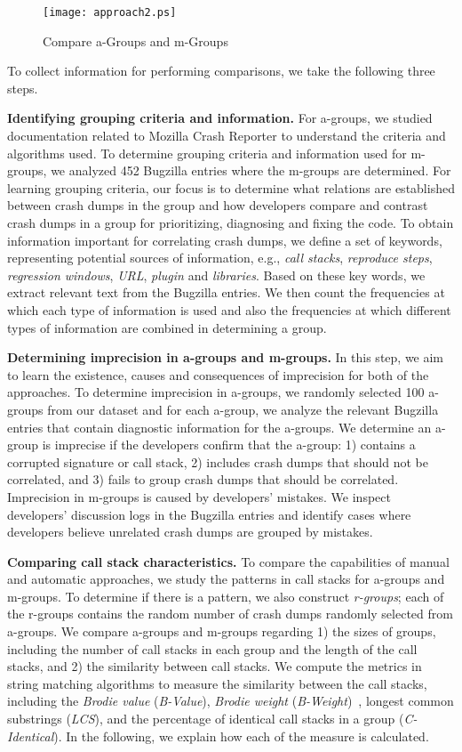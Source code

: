 \begin{figure}[!htb]
\centering
\texttt{[image: approach2.ps]}
\caption{Compare a-Groups and m-Groups~\label{fig:approach}}
\normalsize
\end{figure}

To collect information for performing comparisons, we take the following three steps.

{\bf Identifying grouping criteria and information.} For a-groups, we studied documentation related to Mozilla Crash Reporter to understand the criteria and algorithms used. To determine grouping criteria and information used for m-groups, we analyzed  452 Bugzilla entries where the m-groups are determined. For learning grouping criteria, our focus is to determine what relations are established between crash dumps in the group and how developers compare and contrast crash dumps in a group for prioritizing, diagnosing and fixing the code. To obtain information important for correlating crash dumps, we define a set of keywords, representing potential sources of information,  e.g., {\it call stacks}, {\it reproduce steps}, {\it regression windows}, {\it URL}, {\it plugin} and {\it libraries}. Based on these key words, we extract relevant text from the Bugzilla entries. We then count the frequencies at which each type of information is used and also the frequencies at which different types of information are combined in determining a group.

{\bf Determining imprecision in a-groups and m-groups.} In this step, we aim to learn the existence, causes and consequences of imprecision for both of the approaches. To determine imprecision in a-groups, we randomly selected 100 a-groups from our dataset and for each a-group, we analyze the relevant Bugzilla entries that contain diagnostic information for the a-groups. We determine an a-group is imprecise if the developers confirm that the a-group: 1) contains a corrupted signature or call stack, 2) includes crash dumps that should not be correlated, and 3) fails to group crash dumps that should be correlated.  Imprecision in m-groups is caused by developers' mistakes. We inspect developers' discussion logs in the Bugzilla entries and identify cases where developers believe unrelated crash dumps are grouped by mistakes.

{\bf Comparing call stack characteristics.} To compare the capabilities of manual and automatic approaches, we study the patterns in call stacks for a-groups and m-groups. To determine if there is a pattern, we also construct {\it r-groups}; each of the r-groups contains the random number of crash dumps randomly selected from a-groups.  We compare a-groups and m-groups regarding 1) the sizes of groups, including the number of call stacks in each group and the length of the call stacks, and 2) the similarity between call stacks. We compute the metrics in string matching algorithms to measure the similarity between the call stacks, including the {\it Brodie value} ({\it B-Value}), {\it Brodie weight} ({\it B-Weight})~\cite{brodie:automated,brodie:quickly}, longest common substrings ({\it LCS}), and the percentage of identical call stacks in a group ({\it C-Identical}). In the following, we explain how each of the measure is calculated. 

